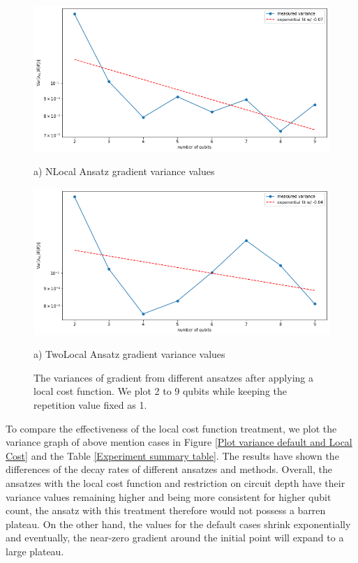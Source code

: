 \begin{figure}
    \includegraphics[width=\textwidth]{Artefact/Appendices/NLocalFixedLocal.png}
    \centerline{a) NLocal Ansatz gradient variance values}
    \includegraphics[width=\textwidth]{Artefact/Appendices/TwoLocalFixedLocal.png}
    \centerline{a) TwoLocal Ansatz gradient variance values}
    \caption{
        The variances of gradient from different ansatzes after applying a local cost function.
        We plot 2 to 9 qubits while keeping the repetition value fixed as 1.
    }
    \label{Plot ansatzes variance local cost}
\end{figure}

To compare the effectiveness of the local cost function treatment, we plot the variance graph of above mention cases in Figure \ref{Plot variance default and Local Cost} and the Table \ref{Experiment summary table}.
The results have shown the differences of the decay rates of different ansatzes and methods.
Overall, the ansatzes with the local cost function and restriction on circuit depth have their variance values remaining higher and being more consistent for higher qubit count, the ansatz with this treatment therefore would not possess a barren plateau.
On the other hand, the values for the default cases shrink exponentially and eventually, the near-zero gradient around the initial point will expand to a large plateau.



